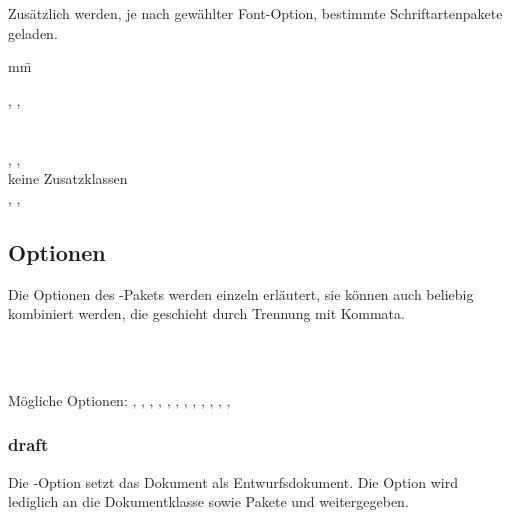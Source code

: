 Zusätzlich werden, je nach gewählter Font-Option, bestimmte Schriftartenpakete geladen.
\begin{tabbing}
	mm\=\kill

	\>, , \\
	\>\\
	\>\\
	\>, , \\
	\>keine Zusatzklassen\\
	\>, , 
\end{tabbing}


\subsection{Optionen}
\label{sec:userdoc:options}

Die Optionen des -Pakets werden einzeln erläutert, sie können auch beliebig kombiniert werden, die geschieht durch Trennung mit Kommata.

\begin{nutzung}
		\>\\
	\beispiel
		\>\\
		\>
\end{nutzung}

Mögliche Optionen: , , , , , , , , , , , , 

\subsubsection{draft}

Die -Option setzt das Dokument als Entwurfsdokument.
Die Option wird lediglich an die Dokumentklasse sowie Pakete  und  weitergegeben.

\begin{nutzung}
		\>\\
\end{nutzung}


